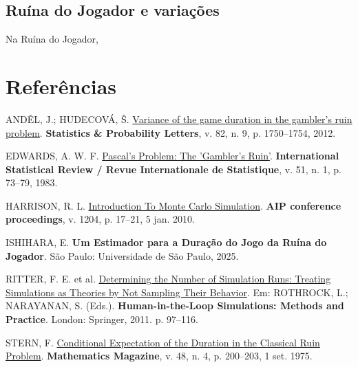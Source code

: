 \documentclass[
  brazilian,
  12pt,
]{article}
\newlength{\cslhangindent}
\newenvironment{CSLReferences}[2] %
 {\begin{list}{}{%
  \setlength{\itemindent}{0pt}
  \setlength{\leftmargin}{0pt}
  \setlength{\parsep}{0pt}
  \ifodd #1
   \setlength{\leftmargin}{\cslhangindent}
   \setlength{\itemindent}{-1\cslhangindent}
  \fi
  \setlength{\itemsep}{#2\baselineskip}}}
 {\end{list}}
\theoremstyle{definition}
\theoremstyle{definition}
\theoremstyle{remark}
\begin{document}
\subsection{Ruína do Jogador e
variações}\label{ruuxedna-do-jogador-e-variauxe7uxf5es}

Na Ruína do Jogador,

\newpage{}

\section{Referências}\label{referuxeancias}

\protect{}\label{refs}
\begin{CSLReferences}{0}{1}
ANDĚL, J.; HUDECOVÁ, Š.
\href{https://doi.org/10.1016/j.spl.2012.05.023}{Variance of the game
duration in the gambler's ruin problem}. \textbf{Statistics \&
Probability Letters}, v. 82, n. 9, p. 1750--1754, 2012.

EDWARDS, A. W. F. \href{https://doi.org/10.2307/1402732}{Pascal's
Problem: The 'Gambler's Ruin'}. \textbf{International Statistical Review
/ Revue Internationale de Statistique}, v. 51, n. 1, p. 73--79, 1983.

HARRISON, R. L. \href{https://doi.org/10.1063/1.3295638}{Introduction To
Monte Carlo Simulation}. \textbf{{AIP} conference proceedings}, v. 1204,
p. 17--21, 5 jan. 2010.

ISHIHARA, E. \textbf{Um Estimador para a Duração do Jogo da Ruína do
Jogador}. São Paulo: Universidade de São Paulo, 2025.

RITTER, F. E. et al.
\href{https://doi.org/10.1007/978-0-85729-883-6_5}{Determining the
Number of Simulation Runs: Treating Simulations as Theories by Not
Sampling Their Behavior}. Em: ROTHROCK, L.; NARAYANAN, S. (Eds.).
\textbf{Human-in-the-Loop Simulations: Methods and Practice}. London:
Springer, 2011. p. 97--116.

STERN, F.
\href{https://doi.org/10.1080/0025570X.1975.11976486}{Conditional
Expectation of the Duration in the Classical Ruin Problem}.
\textbf{Mathematics Magazine}, v. 48, n. 4, p. 200--203, 1 set. 1975.

\end{CSLReferences}
\end{document}
